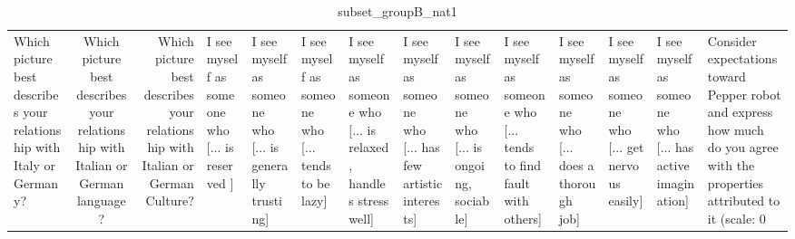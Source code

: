 \begin{table}
\caption{subset_groupB_nat1}
\label{tab:subset_groupB_nat1}
\begin{tabular}{lcr}
\toprule
Which picture best describes your relationship with Italy or Germany? & Which picture best describes your relationship with Italian or German language? & Which picture best describes your relationship with Italian or German Culture? & I see myself as someone who  [... is reserved ] & I see myself as someone who  [... is generally trusting] & I see myself as someone who  [... tends to be lazy] & I see myself as someone who  [... is relaxed, handles stress well] & I see myself as someone who  [... has few artistic interests] & I see myself as someone who  [... is ongoing, sociable] & I see myself as someone who  [... tends to find fault with others] & I see myself as someone who  [... does a thorough job] & I see myself as someone who  [... get nervous easily] & I see myself as someone who  [... has active imagination] & Consider expectations toward Pepper robot and express how much do you agree with the properties attributed to it (scale: 0%
\end{tabular}
\end{table}
